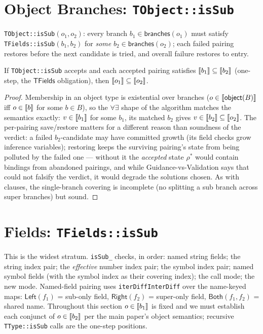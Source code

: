\documentclass[11pt]{article}
\newcommand{\TFields}{\mathsf{TFields}}
\begin{document}
\section{Object Branches: \texttt{TObject::isSub}}
\label{sec:tobject}

\begin{definition}
\texttt{TObject::isSub}$(o_1, o_2)$: every branch
$b_1 \in \mathsf{branches}(o_1)$ must satisfy
\texttt{TFields::isSub}$(b_1, b_2)$ for \emph{some}
$b_2 \in \mathsf{branches}(o_2)$; each failed pairing restores before the
next candidate is tried, and overall failure restores to entry.
\end{definition}

\begin{lemma}
\label{lem:tobject}
If \texttt{TObject::isSub} accepts and each accepted pairing satisfies
$\llbracket b_1 \rrbracket \subseteq \llbracket b_2 \rrbracket$ (one-step, the $\TFields$ obligation),
then $\llbracket o_1 \rrbracket \subseteq \llbracket o_2 \rrbracket$.
\end{lemma}
\begin{proof}
Membership in an object type is existential over branches
($o \in \llbracket \mathsf{object}(B) \rrbracket$ iff $o \in \llbracket b \rrbracket$ for some
$b \in B$), so the $\forall\exists$ shape of the algorithm matches the
semantics exactly: $v \in \llbracket b_1 \rrbracket$ for some $b_1$, its matched $b_2$
gives $v \in \llbracket b_2 \rrbracket \subseteq \llbracket o_2 \rrbracket$. The per-pairing
save/restore matters for a different reason than soundness of the
verdict: a failed $b_2$-candidate may have committed growth (its field
checks grow inference variables); restoring keeps the surviving
pairing's state from being polluted by the failed one --- without it the
\emph{accepted} state $\rho^\ast$ would contain bindings from abandoned
pairings, and while Guidance-vs-Validation says that could not falsify
the verdict, it would degrade the solutions chosen. As with clauses, the
single-branch covering is incomplete (no splitting a sub branch across
super branches) but sound.
\end{proof}

\section{Fields: \texttt{TFields::isSub}}
\label{sec:tfields}

This is the widest stratum. \texttt{isSub\_} checks, in order: named
string fields; the string index pair; the \emph{effective} number index
pair; the symbol index pair; named symbol fields (with the symbol index
as their covering index); the call mode; the new mode. Named-field
pairing uses \texttt{iterDiffInterDiff} over the name-keyed maps:
$\mathsf{Left}(f_1)$ = sub-only field, $\mathsf{Right}(f_2)$ = super-only
field, $\mathsf{Both}(f_1,f_2)$ = shared name. Throughout this section
$o \in \llbracket b_1 \rrbracket$ is fixed and we must establish each conjunct of
$o \in \llbracket b_2 \rrbracket$ per the main paper's object semantics; recursive
\texttt{TType::isSub} calls are the one-step positions.
\end{document}
